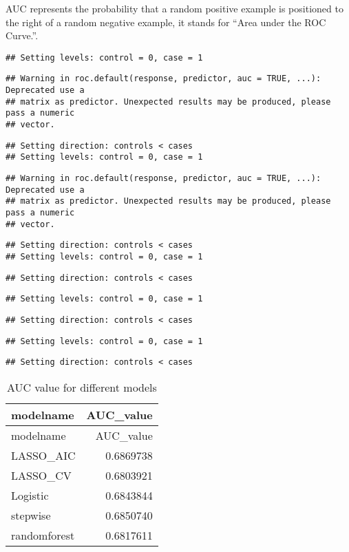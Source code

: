 \documentclass[
]{article}
\begin{document}
AUC represents the probability that a random positive example is
positioned to the right of a random negative example, it stands for
``Area under the ROC Curve.''.

\begin{verbatim}
## Setting levels: control = 0, case = 1
\end{verbatim}

\begin{verbatim}
## Warning in roc.default(response, predictor, auc = TRUE, ...): Deprecated use a
## matrix as predictor. Unexpected results may be produced, please pass a numeric
## vector.
\end{verbatim}

\begin{verbatim}
## Setting direction: controls < cases
## Setting levels: control = 0, case = 1
\end{verbatim}

\begin{verbatim}
## Warning in roc.default(response, predictor, auc = TRUE, ...): Deprecated use a
## matrix as predictor. Unexpected results may be produced, please pass a numeric
## vector.
\end{verbatim}

\begin{verbatim}
## Setting direction: controls < cases
## Setting levels: control = 0, case = 1
\end{verbatim}

\begin{verbatim}
## Setting direction: controls < cases
\end{verbatim}

\begin{verbatim}
## Setting levels: control = 0, case = 1
\end{verbatim}

\begin{verbatim}
## Setting direction: controls < cases
\end{verbatim}

\begin{verbatim}
## Setting levels: control = 0, case = 1
\end{verbatim}

\begin{verbatim}
## Setting direction: controls < cases
\end{verbatim}

\begin{longtable}[]{@{}lr@{}}
\caption{AUC value for different models}\tabularnewline
\toprule
modelname & AUC\_value \\
\midrule
\endfirsthead
\toprule
modelname & AUC\_value \\
\midrule
\endhead
LASSO\_AIC & 0.6869738 \\
LASSO\_CV & 0.6803921 \\
Logistic & 0.6843844 \\
stepwise & 0.6850740 \\
randomforest & 0.6817611 \\
\bottomrule
\end{longtable}
\end{document}

